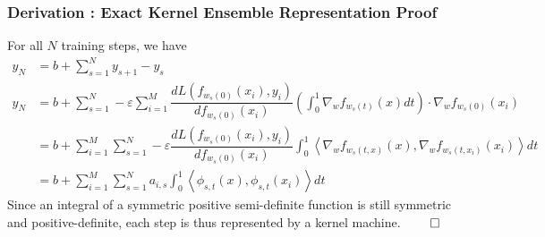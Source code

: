\begin{frame}
  \frametitle{Derivation : Exact Kernel Ensemble Representation Proof}

For all $N$ training steps, we have
\begin{align*}
y_N &= b + \sum_{s=1}^N y_{s+1} - y_s\\
y_N &= b + \sum_{s = 1}^N -\varepsilon \sum_{i = 1}^{M} \dfrac{d
      L(f_{w_s(0)}(x_i),  y_i)}{d f_{w_s(0)}(x_i)}
      \left(\int_0^1\nabla_w f_{w_s(t)}(x)dt\right) \cdot \nabla_w
      f_{w_s(0)}(x_i)\\   \label{eqint}
&= b + \sum_{i = 1}^{M}\sum_{s = 1}^N -\varepsilon  \dfrac{d L(f_{w_s(0)}(x_i),  y_i)}{d f_{w_s(0)}(x_i)}  \int_0^1\left\langle \nabla_w f_{w_s(t,x)}(x), \nabla_w f_{w_s(t,x_i)}(x_i) \right\rangle dt\\ 
&= b + \sum_{i = 1}^{M}\sum_{s = 1}^N a_{i, s}  \int_0^1 \left\langle \phi_{s,t}(x), \phi_{s,t}(x_i)\right\rangle dt
\end{align*}
Since an integral of a symmetric positive semi-definite function is
still symmetric and positive-definite, each step is thus represented
by a kernel machine.  $\qed$

\end{frame}

